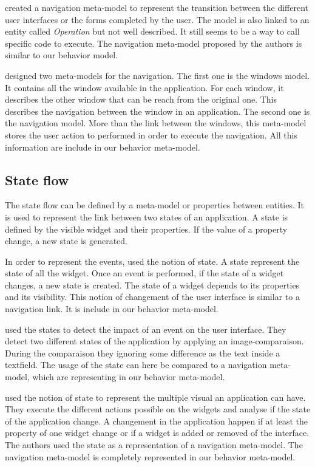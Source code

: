 \documentclass[conference]{IEEEtran}
\begin{document}
\citet{fleurey2007model} created a navigation meta-model to represent the
    transition between the different user interfaces or the forms completed by the user.
The model is also linked to an entity called \textit{Operation} but not well described.
It still seems to be a way to call specific code to execute.
The navigation meta-model proposed by the authors is similar to our behavior model.

\citet{morgado2011reverse} designed two meta-models for the navigation.
The first one is the windows model.
It contains all the window available in the application.
For each window, it describes the other window that can be reach from the original one.
This describes the navigation between the window in an application.
The second one is the navigation model.
More than the link between the windows,
    this meta-model stores the user action to performed in order to execute the navigation.
All this information are include in our behavior meta-model.

\subsection{State flow}
\label{sec:state}

The state flow can be defined by a meta-model or properties between entities.
It is used to represent the link between two states of an application.
A state is defined by the visible widget and their properties.
If the value of a property change, a new state is generated.

In order to represent the events, 
    \citet{memon2007eventflow} used the notion of state.
A state represent the state of all the widget.
Once an event is performed,
    if the state of a widget changes, a new state is created.
The state of a widget depends to its properties and its visibility.
This notion of changement of the user interface is similar to a navigation link.
It is include in our behavior meta-model.

\citet{joorabchi2012reverse} used the states to detect the impact
    of an event on the user interface.
They detect two different states of the application by applying an image-comparaison.
During the comparaison they ignoring some difference as the text inside a textfield.
The usage of the state can here be compared to a navigation meta-model,
    which are representing in our behavior meta-model.

\citet{mesbah2012crawling} used the notion of state to represent the multiple
    visual an application can have.
They execute the different actions possible on the widgets and analyse if the state of the application change.
A changement in the application happen if at least the property of one widget change or if a widget is added or removed of the interface.
The authors used the state as a representation of a navigation meta-model.
The navigation meta-model is completely represented in our behavior meta-model.
\end{document}

